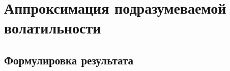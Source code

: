 

\section{Аппроксимация подразумеваемой волатильности}
\label{lv-s:s:hagan}
\subsection{Формулировка результата}

